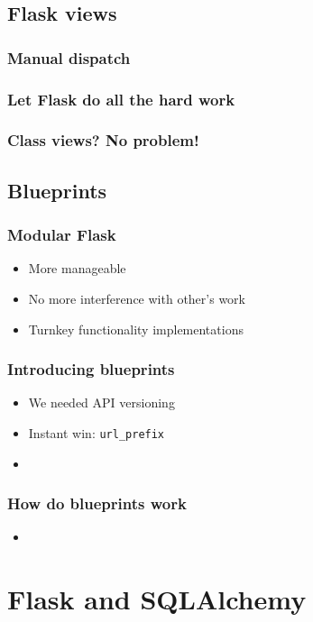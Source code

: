 \documentclass{beamer}
\begin{document}
\subsection{Flask views}

\begin{frame}
  \frametitle{Manual dispatch}
  
\end{frame}

\begin{frame}
  \frametitle{Let Flask do all the hard work}
  
\end{frame}

\begin{frame}
  \frametitle{Class views? No problem!}
  
\end{frame}

\subsection{Blueprints}

\begin{frame}
  \frametitle{Modular Flask}
  \begin{itemize}
  \item More manageable
  \item No more interference with other's work
  \item Turnkey functionality implementations
  \end{itemize}
\end{frame}

\begin{frame}
  \frametitle{Introducing blueprints}
  \begin{itemize}
  \item We needed API versioning
  \item Instant win: \texttt{url\_prefix}
  \item
  \end{itemize}
\end{frame}

\begin{frame}
  \frametitle{How do blueprints work}
  \begin{itemize}
  \item
  \end{itemize}

\end{frame}

\section{Flask and SQLAlchemy}
\end{document}
